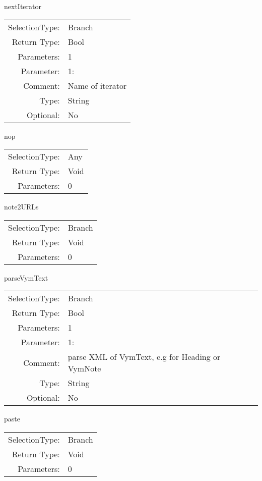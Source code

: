\item nextIterator\\
\begin{tabular}{rl}
  SelectionType: & Branch\\
    Return Type: & Bool\\
     Parameters: & 1\\
   Parameter: &  1:\\
        Comment: & Name of iterator\\
           Type: & String\\
       Optional: &  No\\
\end{tabular}

\item nop\\
\begin{tabular}{rl}
  SelectionType: & Any\\
    Return Type: & Void\\
     Parameters: & 0\\
\end{tabular}

\item note2URLs\\
\begin{tabular}{rl}
  SelectionType: & Branch\\
    Return Type: & Void\\
     Parameters: & 0\\
\end{tabular}

\item parseVymText\\
\begin{tabular}{rl}
  SelectionType: & Branch\\
    Return Type: & Bool\\
     Parameters: & 1\\
   Parameter: &  1:\\
        Comment: & parse XML of VymText, e.g for Heading or VymNote\\
           Type: & String\\
       Optional: &  No\\
\end{tabular}

\item paste\\
\begin{tabular}{rl}
  SelectionType: & Branch\\
    Return Type: & Void\\
     Parameters: & 0\\
\end{tabular}

